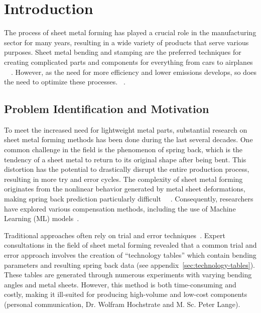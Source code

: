 \chapter{Introduction}\label{ch:introduction}

The process of sheet metal forming has played a crucial role in the manufacturing sector for many years, resulting in
a wide variety of products that serve various purposes.
Sheet metal bending and stamping are the preferred techniques for creating complicated parts and components for
everything from cars to airplanes
~\cite[p. 1]{cruz_applicationmachinelearning_2021}~\cite[p.1]{liu2021deep}.
However, as the need for more efficiency and lower emissions develops, so does the need to optimize these processes.
~\cite[p. 4]{zheng_reviewformingtechniques_2018}.


\section{Problem Identification and Motivation}\label{sec:problem-identification-and-motivation}
To meet the increased need for lightweight metal parts, substantial research on sheet metal forming methods has been
done during the last several decades.
One common challenge in the field is the phenomenon of spring back, which is the tendency of a sheet metal to return
to its original shape after being bent.
This distortion has the potential to drastically disrupt the entire production process, resulting in more try and
error cycles.
The complexity of sheet metal forming originates from the nonlinear behavior generated by metal sheet deformations,
making spring back prediction particularly difficult
~\cite[p. 1]{miranda_formingspringbackprediction_2018}~\cite[p. 1]{cruz_applicationmachinelearning_2021}.
Consequently, researchers have explored various compensation methods, including the use of Machine Learning (ML)
models~\cite[p.1]{liu2021deep}.

Traditional approaches often rely on trial and error techniques~\cite[p. 1]{dib_singleensembleclassifiers_2020}.
Expert consultations in the field of sheet metal forming revealed that a common trial and error approach involves the
creation of ``technology tables'' which contain bending parameters and resulting spring back data
(see appendix~\ref{sec:technology-tables}).
These tables are generated through numerous experiments with varying bending angles and metal sheets.
However, this method is both time-consuming and costly, making it ill-suited for producing high-volume and low-cost
components (personal communication, Dr. Wolfram Hochstrate and M. Sc. Peter Lange).

